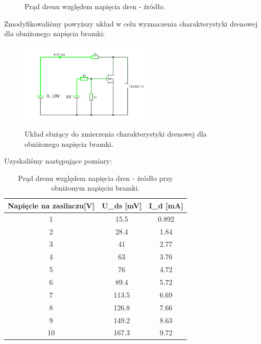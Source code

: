 \documentclass[polish,polish,a4paper]{article}
\begin{document}
\begin{figure}[H]
\centering
{}
\caption{Prąd drenu względem napięcia dren - źródło.}
\end{figure}

Zmodyfikowaliśmy powyższy układ w celu wyznaczenia charakterystyki drenowej dla obniżonego napięcia bramki:
\begin{figure}[H]
\centering
\includegraphics[width=0.55\textwidth]{nmos drenowa obnizona.pdf}
\caption{Układ służący do zmierzenia charakterystyki drenowej dla obniżonego napięcia bramki.}
\end{figure}

Uzyskaliśmy następujące pomiary:


\begin{table}[H]
\centering
\begin{tabular}{|c|c|c|}
\hline
Napięcie na zasilaczu[V] & U\_ds [mV] & I\_d [mA]  \\
\hline
1&15.5 & 0.892 \\
\hline
2 &28.4 & 1.84 \\
\hline
3 &41 & 2.77 \\
\hline
4 &63 & 3.76 \\
\hline
5 &76 & 4.72 \\
\hline
6 &89.4 & 5.72 \\
\hline
7 &113.5 & 6.69 \\
\hline
8 &126.8 & 7.66 \\
\hline
9 &149.2 & 8.63 \\
\hline
10 &167.3 & 9.72 \\
\hline
\end{tabular}
\caption{Prąd drenu względem napięcia dren - źródło przy obniżonym napięciu bramki.}
\end{table}
\end{document}
